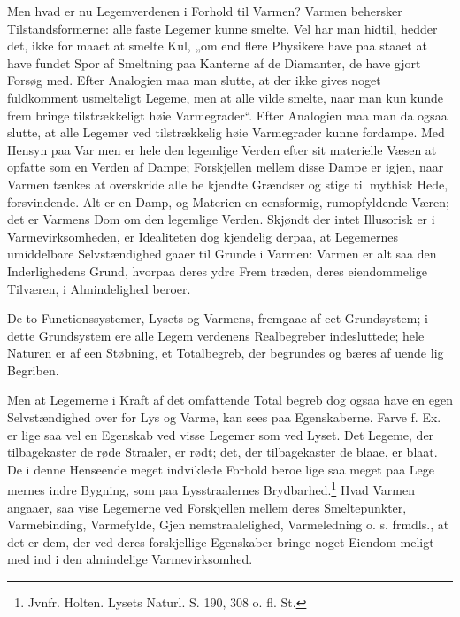 \documentclass[12pt,a4paper]{book}
\begin{document}
Men hvad er nu Legemverdenen i Forhold til Varmen?
Varmen behersker Tilstandsformerne: alle faste Legemer kunne smelte.
Vel har man hidtil, hedder det, ikke for\-%
maaet at smelte Kul, „om end flere Physikere have paa\-%
staaet at have fundet Spor af Smeltning paa Kanterne af de Diamanter,
de have gjort Forsøg med. Efter Analogien maa man slutte, at der ikke
gives noget fuldkomment usmelteligt Legeme, men at alle vilde smelte,
naar man kun kunde frem\-%
bringe tilstrækkeligt høie Varmegrader“. Efter Analogien maa man da
ogsaa slutte, at alle Legemer ved tilstrækkelig høie Varmegrader kunne
fordampe. Med Hensyn paa Var\-%
men er hele den legemlige Verden efter sit materielle Væsen at opfatte
som en Verden af Dampe; Forskjellen mellem disse Dampe er igjen, naar
Varmen tænkes at overskride alle be\-%
kjendte Grændser og stige til mythisk Hede, forsvindende. Alt er en
Damp, og Materien en eensformig, rumopfyldende Væren; det er Varmens
Dom om den legemlige Verden. Skjøndt der intet Illusorisk er i
Varmevirksomheden, er Idealiteten dog kjendelig derpaa, at Legemernes
umiddelbare Selvstændighed gaaer til Grunde i Varmen: Varmen er alt\-%
saa den Inderlighedens Grund, hvorpaa deres ydre Frem\-%
træden, deres eiendommelige Tilværen, i Almindelighed beroer.

De to Functionssystemer, Lysets og Varmens, fremgaae af eet
Grundsystem; i dette Grundsystem ere alle Legem\-%
verdenens Realbegreber indesluttede; hele Naturen er af een Støbning,
et Totalbegreb, der begrundes og bæres af uende\-%
lig Begriben.

Men at Legemerne i Kraft af det omfattende Total\-%
begreb dog ogsaa have en egen Selvstændighed over for Lys og Varme, kan
sees paa Egenskaberne. Farve f. Ex. er lige saa vel en Egenskab ved
visse Legemer som ved Lyset. Det Legeme, der tilbagekaster de røde
Straaler, er rødt; det, der tilbagekaster de blaae, er blaat. De i
denne Henseende meget indviklede Forhold beroe lige saa meget paa
Lege\-%
mernes indre Bygning, som paa Lysstraalernes
Brydbarhed.\footnote{Jvnfr. Holten. Lysets Naturl. S. 190, 308 o. fl.
St.} Hvad Varmen angaaer, saa vise Legemerne ved Forskjellen mellem
deres Smeltepunkter, Varmebinding, Varmefylde, Gjen\-%
nemstraalelighed, Varmeledning o. s. frmdls., at det er dem, der ved
deres forskjellige Egenskaber bringe noget Eiendom\-%
meligt med ind i den almindelige Varmevirksomhed.
\end{document}
